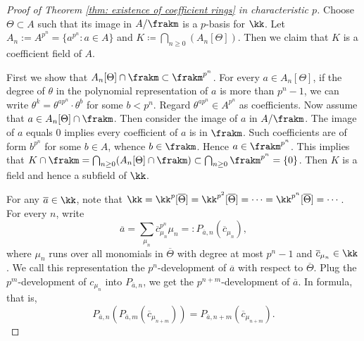         \begin{proof}[Proof of Theorem \ref{thm: existence of coefficient rings} in characteristic \(p\)]
            Choose \(\Theta \subset A\) such that its image in \(A/\frakm\) is a \(p\)-basis for \(\kk\).
            Let \(A_n := A^{p^n} = \{a^{p^n} \colon a \in A\}\) and \(K \coloneqq \bigcap_{n \geq 0} (A_n[\Theta])\).
            Then we claim that \(K\) is a coefficient field of \(A\).

            First we show that \(A_n[\Theta] \cap \frakm \subset \frakm^{p^n}\).
            For every \(a \in A_n[\Theta]\), 
            if the degree of \(\theta\) in the polynomial representation of \(a\) is more than \(p^n-1\), 
            we can write \(\theta^k = \theta^{a p^n} \cdot \theta^{b}\) for some \(b < p^n\).
            Regard \(\theta^{a p^n} \in A^{p^n}\) as coefficients.
            Now assume that \(a \in A_n[\Theta] \cap \frakm\).
            Then consider the image of \(a\) in \(A/\frakm\).
            The image of \(a\) equals \(0\) implies every coefficient of \(a\) is in \(\frakm\).
            Such coefficients are of form \(b^{p^n}\) for some \(b \in A\), whence \(b \in \frakm\).
            Hence \(a \in \frakm^{p^n}\).
            This implies that \(K \cap \frakm = \bigcap_{n \geq 0} (A_n[\Theta] \cap \frakm) \subset \bigcap_{n \geq 0} \frakm^{p^n} = \{0\}\).
            Then \(K\) is a field and hence a subfield of \(\kk\).

            For any \(\overline{a} \in \kk\), note that 
            \( \kk = \kk^p[\overline{\Theta}] = \kk^{p^2}[\overline{\Theta}] = \cdots = \kk^{p^n}[\overline{\Theta}] = \cdots\).
            For every \(n\), write 
            \[ \overline{a} = \sum_{\mu_n} \overline{c}_{\mu_n}^{p^n} \mu_n =: P_{\overline{a},n}(\overline{c}_{\mu_n}), \]
            where \(\mu_n\) runs over all monomials in \(\overline{\Theta}\) with degree at most \(p^n-1\) and \(\overline{c}_{\mu_n} \in \kk\).
            We call this representation the \(p^n\)-development of \(\overline{a}\) with respect to \(\overline{\Theta}\).
            Plug the \(p^m\)-development of \(c_{\mu_n}\) into \(P_{\overline{a},n}\), we get the \(p^{n+m}\)-development of \(\overline{a}\).
            In formula, that is, 
            \[ P_{\overline{a},n}(P_{\overline{a},m}(\overline{c}_{\mu_{n+m}})) = P_{\overline{a},n+m}(\overline{c}_{\mu_{n+m}}). \]


\end{proof}

